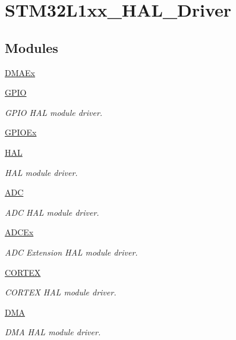 \hypertarget{group___s_t_m32_l1xx___h_a_l___driver}{\section{S\-T\-M32\-L1xx\-\_\-\-H\-A\-L\-\_\-\-Driver}
\label{group___s_t_m32_l1xx___h_a_l___driver}
}
\subsection*{Modules}
\begin{DoxyCompactItemize}
\item 
\hyperlink{group___d_m_a_ex}{D\-M\-A\-Ex}
\item 
\hyperlink{group___g_p_i_o}{G\-P\-I\-O}
\begin{DoxyCompactList}\small\item\em G\-P\-I\-O H\-A\-L module driver. \end{DoxyCompactList}\item 
\hyperlink{group___g_p_i_o_ex}{G\-P\-I\-O\-Ex}
\item 
\hyperlink{group___h_a_l}{H\-A\-L}
\begin{DoxyCompactList}\small\item\em H\-A\-L module driver. \end{DoxyCompactList}\item 
\hyperlink{group___a_d_c}{A\-D\-C}
\begin{DoxyCompactList}\small\item\em A\-D\-C H\-A\-L module driver. \end{DoxyCompactList}\item 
\hyperlink{group___a_d_c_ex}{A\-D\-C\-Ex}
\begin{DoxyCompactList}\small\item\em A\-D\-C Extension H\-A\-L module driver. \end{DoxyCompactList}\item 
\hyperlink{group___c_o_r_t_e_x}{C\-O\-R\-T\-E\-X}
\begin{DoxyCompactList}\small\item\em C\-O\-R\-T\-E\-X H\-A\-L module driver. \end{DoxyCompactList}\item 
\hyperlink{group___d_m_a}{D\-M\-A}
\begin{DoxyCompactList}\small\item\em D\-M\-A H\-A\-L module driver. \end{DoxyCompactList}\item 

\end{DoxyCompactItemize}
